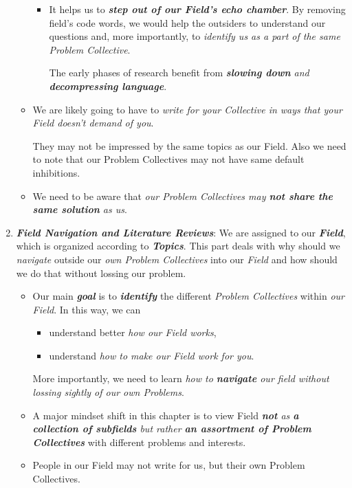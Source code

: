 \documentclass[11pt]{article}
\begin{document}
\begin{enumerate}
\begin{itemize}
\begin{itemize}
\item It helps us to \emph{\textbf{step out of our Field’s echo chamber}}. By removing field's code words, we would help the outsiders to understand our questions and, more importantly, to \emph{identify us as a part of the same Problem Collective}.  

The early phases of research benefit from \emph{\textbf{slowing down} and \textbf{decompressing language}}.
\end{itemize}

\item We are likely going to have to \emph{write for your Collective in ways that your Field doesn’t demand of you}.

They may not be impressed by the same topics as our Field. Also we need to note that our Problem Collectives may not have same default inhibitions. 

\item We need to be aware that \emph{our Problem Collectives may \textbf{not share the same solution} as us}. 
\end{itemize}

\item  \emph{\textbf{Field Navigation and Literature Reviews}}: We are assigned to our \emph{\textbf{Field}}, which is organized according to \emph{\textbf{Topics}}. This part deals with why should we \emph{navigate} outside our \emph{own Problem Collectives} into our \emph{Field} and how should we do that without lossing our problem. 
\begin{itemize}
\item Our main \emph{\textbf{goal}} is to \emph{\textbf{identify}} the different \emph{Problem Collectives} within \emph{our Field}. In this way, we can 
\begin{itemize}
\item understand better \emph{how our Field works},
\item understand \emph{how to make our Field work for you}. 
\end{itemize} More importantly, we need to learn \emph{how to \textbf{navigate} our field without lossing sightly of our own Problems}.

\item A major mindset shift in this chapter is to view Field \emph{\textbf{not} as \textbf{a collection of subfields} but rather \textbf{an assortment of Problem Collectives}} with different problems and interests.

\item People in our Field may not write for us, but their own Problem Collectives. 


\end{itemize}
\end{enumerate}
\end{document}

